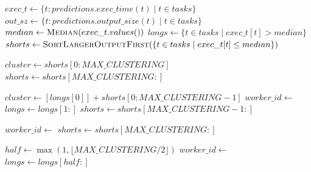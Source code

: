 \begin{algorithm}
    \caption{AssignGroup Procedure}
    \label{alg:assign_group}
    \small
    \begin{algorithmic}[1]
            \Return
        \EndIf
        
        \State $exec\_t \gets \{t: predictions.exec\_time(t) \mid t \in tasks\}$
        \State $out\_sz \gets \{t: predictions.output\_size(t) \mid t \in tasks\}$
        \State $median \gets \textsc{Median}(exec\_t.values())$
        \State $longs \gets \{t \in tasks \mid exec\_t[t] > median\}$
        \State $shorts \gets \textsc{SortLargerOutputFirst}(\{t \in tasks \mid exec\_t[t] \leq median\})$
        
        \Statex
        \State {}
            \State $cluster \gets shorts[0:MAX\_CLUSTERING]$
            \State {}
            \State $shorts \gets shorts[MAX\_CLUSTERING:]$
        \EndIf
        
        \Statex
        \State {}
            \State $cluster \gets [longs[0]] + shorts[0:MAX\_CLUSTERING-1]$
            \State $worker\_id \gets$ 
            \State {}
            \State $longs \gets longs[1:]$
            \State $shorts \gets shorts[MAX\_CLUSTERING-1:]$
        \EndWhile
        
        \Statex
        \State {}
            \State $worker\_id \gets$ 
            \State {}
            \State $shorts \gets shorts[MAX\_CLUSTERING:]$
        \EndWhile
        
        \Statex
        \State {}
        \State $half \gets \max(1, \lfloor MAX\_CLUSTERING / 2 \rfloor)$
            \State $worker\_id \gets$ 
            \State {}
            \State $longs \gets longs[half:]$
        \EndWhile
    \EndFunction
    \end{algorithmic}
\end{algorithm}

